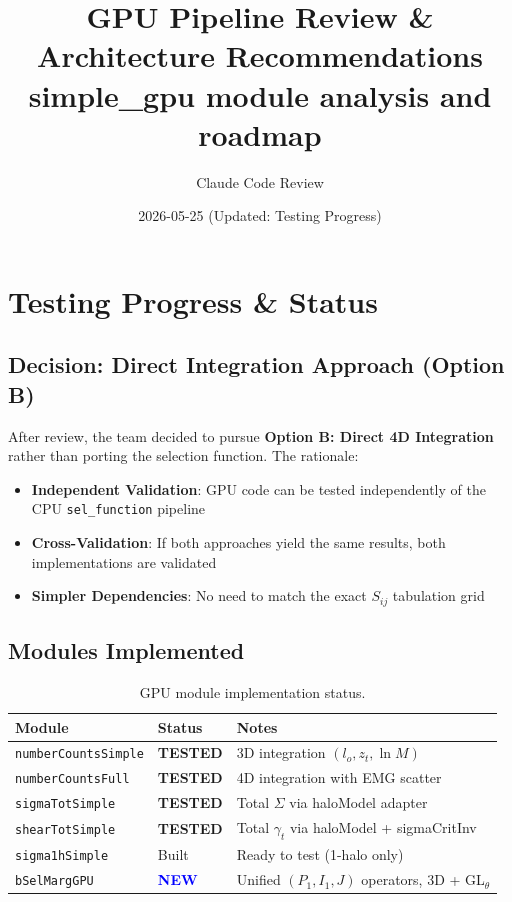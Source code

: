 \documentclass[a4paper, 11pt]{article}
\title{\vspace{-4ex}\huge \textbf{GPU Pipeline Review \& Architecture Recommendations}\\[0.5ex]
       \Large \textbf{simple\_gpu module analysis and roadmap}}
\author{Claude Code Review}
\date{2026-05-25 (Updated: Testing Progress)}
\begin{document}
\maketitle

\tableofcontents
\vspace{1em}

\section{Testing Progress \& Status}
\label{sec:status}

\subsection{Decision: Direct Integration Approach (Option B)}

After review, the team decided to pursue \textbf{Option B: Direct 4D Integration} rather than porting the selection function. The rationale:

\begin{itemize}
  \setlength\itemsep{2pt}
  \item \textbf{Independent Validation}: GPU code can be tested independently of the CPU \texttt{sel\_function} pipeline
  \item \textbf{Cross-Validation}: If both approaches yield the same results, both implementations are validated
  \item \textbf{Simpler Dependencies}: No need to match the exact $S_{ij}$ tabulation grid
\end{itemize}

\subsection{Modules Implemented}

\begin{table}[H]
\centering
\small
\begin{tabular}{@{}l l l@{}}
\toprule
Module & Status & Notes \\
\midrule
\texttt{numberCountsSimple} & \textcolor{green!50!black}{\textbf{TESTED}} & 3D integration $(l_o, z_t, \ln M)$ \\
\texttt{numberCountsFull} & \textcolor{green!50!black}{\textbf{TESTED}} & 4D integration with EMG scatter \\
\texttt{sigmaTotSimple} & \textcolor{green!50!black}{\textbf{TESTED}} & Total $\Sigma$ via haloModel adapter \\
\texttt{shearTotSimple} & \textcolor{green!50!black}{\textbf{TESTED}} & Total $\gamma_t$ via haloModel + sigmaCritInv \\
\texttt{sigma1hSimple} & Built & Ready to test (1-halo only) \\
\texttt{bSelMargGPU} & \textcolor{blue}{\textbf{NEW}} & Unified $(P_1, I_1, J)$ operators, 3D + GL$_\theta$ \\
\bottomrule
\end{tabular}
\caption{GPU module implementation status.}
\end{table}
\end{document}
